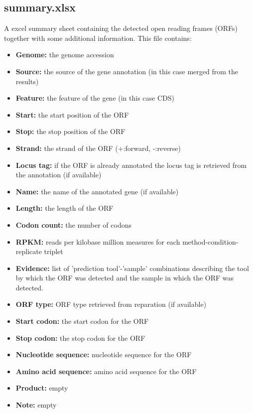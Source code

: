 \documentclass[10pt,a4paper]{article}
\begin{document}
\subsection*{summary.xlsx}
A excel summary sheet containing the detected open reading frames (ORFs) together with some additional information. This file contains: 
\begin{itemize}
\item \textbf{Genome:} the genome accession 
\item \textbf{Source:} the source of the gene annotation (in this case merged from the results)
\item \textbf{Feature:} the feature of the gene (in this case CDS)
\item \textbf{Start:} the start position of the ORF
\item \textbf{Stop:} the stop position of the ORF
\item \textbf{Strand:} the strand of the ORF (+:forward, -:reverse)
\item \textbf{Locus tag:} if the ORF is already annotated the locus tag is retrieved from the annotation (if available)
\item \textbf{Name:} the name of the annotated gene (if available)
\item \textbf{Length:} the length of the ORF
\item \textbf{Codon count:} the number of codons
\item \textbf{RPKM:} reads per kilobase million measures for each method-condition-replicate triplet
\item \textbf{Evidence:} list of 'prediction tool'-'sample' combinations describing the tool by which the ORF was detected and the sample in which the ORF was detected.
\item \textbf{ORF type:} ORF type retrieved from reparation (if available)
\item \textbf{Start codon:} the start codon for the ORF
\item \textbf{Stop codon:} the stop codon for the ORF
\item \textbf{Nucleotide sequence:} nucleotide sequence for the ORF
\item \textbf{Amino acid sequence:} amino acid sequence for the ORF
\item \textbf{Product:} empty
\item \textbf{Note:} empty
\end{itemize}
\end{document}
